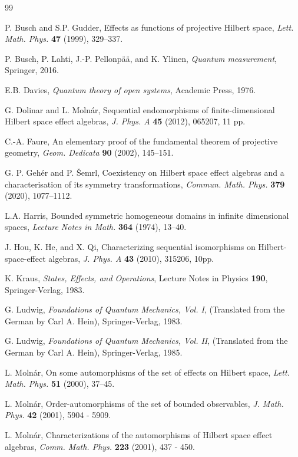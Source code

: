 \documentclass{article}
\begin{document}
\begin{thebibliography}{99}

P. Busch and S.P. Gudder, Effects as functions of projective Hilbert space, {\em Lett. Math. Phys.} {\bf 47} (1999), 329--337.

P. Busch, P. Lahti, J.-P. Pellonp\" a\" a, and K. Ylinen, {\em Quantum measurement}, Springer, 2016.

E.B. Davies, {\em Quantum theory of open systems}, Academic Press, 1976.

G. Dolinar and L. Moln\' ar, Sequential endomorphisms of finite-dimensional Hilbert space effect algebras, {\em J. Phys. A} {\bf 45} (2012), 065207, 11 pp.


C.-A. Faure, An elementary proof of the fundamental theorem of projective
geometry, {\em Geom. Dedicata} {\bf 90} (2002), 145--151.


G. P. Geh\' er and P. \v Semrl, Coexistency on Hilbert space effect algebras and a characterisation of its symmetry transformations, 
{\em Commun. Math. Phys.} {\bf 379}  (2020), 1077--1112. 


L.A. Harris, Bounded symmetric homogeneous domains in infinite dimensional spaces,  {\em Lecture Notes in Math.} {\bf 364} (1974), 13--40.

J. Hou, K. He, and X. Qi, Characterizing sequential isomorphisms on Hilbert-space-effect algebras, {\em J. Phys. A} {\bf 43} (2010), 315206, 10pp.


K. Kraus, {\em States, Effects, and Operations},  Lecture Notes in Physics \textbf{190}, Springer-Verlag, 1983.


G. Ludwig, {\em Foundations of Quantum Mechanics, Vol. I}, (Translated from the German by Carl A. Hein), Springer-Verlag, 1983.

G. Ludwig, {\em Foundations of Quantum Mechanics, Vol. II}, (Translated from the German by Carl A. Hein), Springer-Verlag, 1985.


L. Moln\' ar, On some automorphisms of the set of effects on Hilbert space, {\em Lett. Math. Phys.} {\bf 51} (2000), 37--45.


L. Moln\' ar,  Order-automorphisms of the set of bounded observables, {\em J. Math. Phys.} {\bf 42} (2001), 5904 - 5909. 

L. Moln\' ar,  Characterizations of the automorphisms of Hilbert space effect algebras, {\em Comm. Math. Phys.} {\bf 223} (2001),  437 - 450. 


\end{thebibliography}
\end{document}
